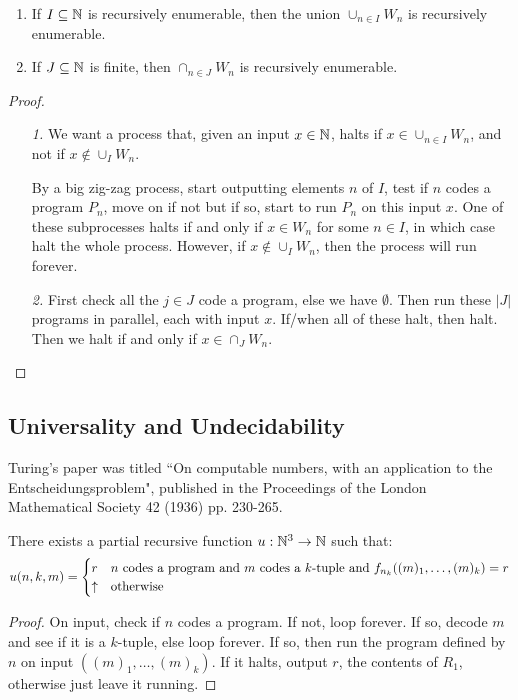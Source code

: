 \documentclass[10pt,a4paper]{article}
\begin{document}
\begin{theorem}\item
\begin{enumerate}
\item If $I \subseteq \mathbb{N}$ is recursively enumerable, then the union $\cup_{n\in I} W_n$ is recursively enumerable.
\item If $J \subseteq \mathbb{N}$ is finite, then $\cap_{n\in J} W_n$ is recursively enumerable.
\end{enumerate}
\end{theorem}
\begin{proof}\item
\begin{itemize}
\item[\textit{1.}] We want a process that, given an input $x \in \mathbb{N}$, halts if $x \in \cup_{n\in I}W_n$, and not if $x \notin \cup_I W_n$.

By a big zig-zag process, start outputting elements $n$ of $I$, test if $n$ codes a program $P_n$, move on if not but if so, start to run $P_n$ on this input $x$. One of these subprocesses halts if and only if $x \in W_n$ for some $n \in I$, in which case halt the whole process. However, if $x \notin \cup_I W_n$, then the process will run forever.

\item[\textit{2.}] First check all the $j \in J$ code a program, else we have $\emptyset$. Then run these $|J|$ programs in parallel, each with input $x$. If/when all of these halt, then halt. Then we halt if and only if $x \in \cap_J W_n$.
\end{itemize}
\end{proof}

\subsection*{Universality and Undecidability}
Turing's paper was titled ``On computable numbers, with an application to the Entscheidungsproblem", published in the Proceedings of the London Mathematical Society 42 (1936) pp. 230-265.

\begin{theorem}
There exists a partial recursive function $u:\mathbb{N}^3 \to \mathbb{N}$ such that:
\begin{align*}
u(n,k,m) = \begin{cases} r & n \text{ codes a program and $m$ codes a $k$-tuple and $f_{n_k}((m)_1,\ldots,(m)_k) = r$} \\
\uparrow & \text{otherwise} \end{cases}
\end{align*}
\end{theorem}
\begin{proof}
On input, check if $n$ codes a program. If not, loop forever. If so, decode $m$ and see if it is a $k$-tuple, else loop forever. If so, then run the program defined by $n$ on input $((m)_1, \ldots, (m)_k)$. If it halts, output $r$, the contents of $R_1$, otherwise just leave it running.
\end{proof}
\end{document}
